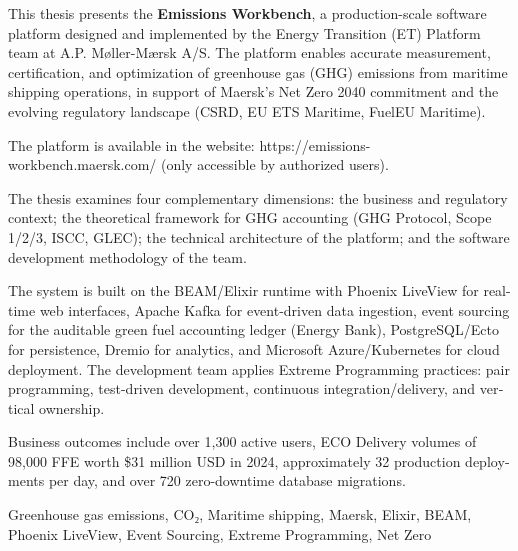 \documentclass[11pt,a4paper,greek,twoside]{template-xe}
\begin{document}
\begin{abstracteng}
\begin{english}
This thesis presents the \textbf{Emissions Workbench}, a
production-scale software platform designed and implemented by the
Energy Transition (ET) Platform team at A.P. Møller-Mærsk A/S. The
platform enables accurate measurement, certification, and optimization
of greenhouse gas (GHG) emissions from maritime shipping operations, in
support of Maersk's Net Zero 2040 commitment and the evolving regulatory
landscape (CSRD, EU ETS Maritime, FuelEU Maritime).

The platform is available in the website:
https://emissions-workbench.maersk.com/ (only accessible by authorized
users).

The thesis examines four complementary dimensions: the business and
regulatory context; the theoretical framework for GHG accounting (GHG
Protocol, Scope 1/2/3, ISCC, GLEC); the technical architecture of the
platform; and the software development methodology of the team.

The system is built on the BEAM/Elixir runtime with Phoenix LiveView for
real-time web interfaces, Apache Kafka for event-driven data ingestion,
event sourcing for the auditable green fuel accounting ledger (Energy
Bank), PostgreSQL/Ecto for persistence, Dremio for analytics, and
Microsoft Azure/Kubernetes for cloud deployment. The development team
applies Extreme Programming practices: pair programming, test-driven
development, continuous integration/delivery, and vertical ownership.

Business outcomes include over 1,300 active users, ECO Delivery volumes
of 98,000 FFE worth \$31 million USD in 2024, approximately 32
production deployments per day, and over 720 zero-downtime database
migrations.
\end{english}
\begin{keywordseng}
\begin{english}
Greenhouse gas emissions, CO₂, Maritime shipping, Maersk, Elixir, BEAM,
Phoenix LiveView, Event Sourcing, Extreme Programming, Net Zero
\end{english}
\end{keywordseng}
\end{abstracteng}
\end{document}
